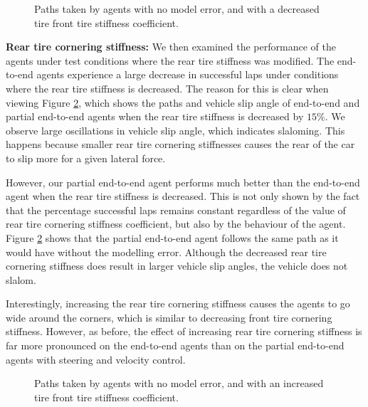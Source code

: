 \begin{figure}[htb!]
    \centering
    
    \caption[Paths taken by agents with no model error, and with a decreased tire front tire stiffness coefficient]{Paths taken by agents with no model error, and with a decreased tire front tire stiffness coefficient.}
    \label{fig:front_cornering_stiffness_-_paths}
\end{figure}

\textbf{Rear tire cornering stiffness:}
We then examined the performance of the agents under test conditions where the rear tire stiffness was modified.
The end-to-end agents experience a large decrease in successful laps under conditions where the rear tire stiffness is decreased.
The reason for this is clear when viewing Figure \ref{fig:rear_cornering_stiffness_-_paths}, which shows the paths and vehicle slip angle of end-to-end and partial end-to-end agents when the rear tire stiffness is decreased by $15\%$.
We observe large oscillations in vehicle slip angle, which indicates slaloming.
This happens because smaller rear tire cornering stiffnesses causes the rear of the car to slip more for a given lateral force.

However, our partial end-to-end agent performs much better than the end-to-end agent when the rear tire stiffness is decreased.
This is not only shown by the fact that the percentage successful laps remains constant regardless of the value of rear tire cornering stiffness coefficient, but also by the behaviour of the agent.
Figure \ref{fig:rear_cornering_stiffness_-_paths} shows that the partial end-to-end agent follows the same path as it would have without the modelling error.
Although the decreased rear tire cornering stiffness does result in larger vehicle slip angles, the vehicle does not slalom.

Interestingly, increasing the rear tire cornering stiffness causes the agents to go wide around the corners, which is similar to decreasing front tire cornering stiffness.
However, as before, the effect of increasing rear tire cornering stiffness is far more pronounced on the end-to-end agents than on the partial end-to-end agents with steering and velocity control.

\begin{figure}[htb!]
    \centering
    
    \caption[Paths taken by agents with no model error, and with an increased tire front tire stiffness coefficient]{Paths taken by agents with no model error, and with an increased tire front tire stiffness coefficient.}
    \label{fig:rear_cornering_stiffness_-_paths}
\end{figure}



